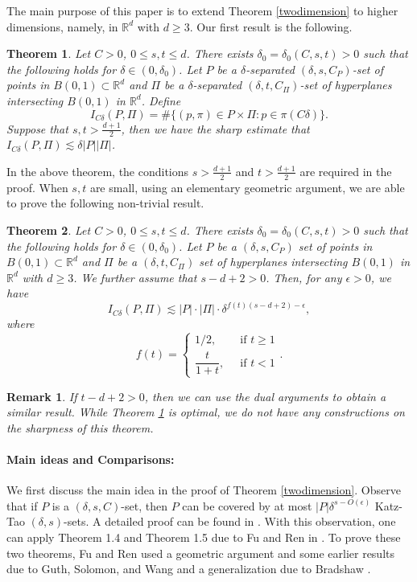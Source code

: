 \documentclass[11pt]{article}
\newtheorem{theorem}{Theorem}[section]
\newtheorem{remark}{Remark}[section]
\newcommand{\1}{\mathbf{1}}
\begin{document}
The main purpose of this paper is to extend Theorem \ref{twodimension} to higher dimensions, namely, in $\mathbb{R}^d$ with $d\ge 3$. Our first result is the following. 
\begin{theorem}\label{main-theorem}Let $C>0$, $0\le s, t\le d$. There exists $\delta_0=\delta_0(C, s, t)>0$ such that the following holds for $\delta\in (0, \delta_0)$. 
    Let $P$ be a $\delta$-separated $(\delta, s, C_P)$-set of points in $B(0, 1)\subset \mathbb{R}^d$ and $\Pi$ be a $\delta$-separated $(\delta, t, C_\Pi)$-set of hyperplanes intersecting $B(0, 1)$ in $\mathbb{R}^d$. Define 
    \[I_{C\delta}(P, \Pi)=\#\{(p, \pi)\in P\times \Pi\colon p\in \pi(C\delta)\}.\] Suppose that $s, t > \frac{d+1}{2}$,
    then we have the sharp estimate that $I_{C\delta}(P, \Pi)\lesssim \delta |P||\Pi|$. 
\end{theorem}
In the above theorem, the conditions $s > \frac{d+1}{2}$ and $t > \frac{d+1}{2}$ are required in the proof. When $s, t$ are small, using an elementary geometric argument, we are able to prove the following non-trivial result. 
\begin{theorem}\label{CSbound}Let $C>0$, $0\le s, t\le d$. There exists $\delta_0=\delta_0(C, s, t)>0$ such that the following holds for $\delta\in (0, \delta_0)$. 
    Let $P$ be a $(\delta,s,C_P)$ set of points in $B(0, 1)\subset \mathbb{R}^d$ and $\Pi$ be a $(\delta,t,C_\Pi)$ set of hyperplanes intersecting $B(0, 1)$ in $\mathbb{R}^d$ with $d \geq 3$. We further assume that $s-d+2 >0$. Then, for any $\epsilon >0$, we have
    \[I_{C\delta}(P,\Pi)\lesssim  |P|\cdot|\Pi|\cdot \delta^{f(t)(s-d+2) - \epsilon},\] where  \[
        f(t) =
        \begin{cases}
        1/2,  ~&\text{ if } t\ge 1\\
        \dfrac{t}{1+t}, ~&\text{ if } t<1
        \end{cases}.\]
\end{theorem}
\begin{remark}
    If $t-d+2 > 0$, then we can use the dual arguments to obtain a similar result. While Theorem \ref{main-theorem} is optimal, we do not have any constructions on the sharpness of this theorem. 
\end{remark}

\paragraph{Main ideas and Comparisons:} We first discuss the main idea in the proof of Theorem \ref{twodimension}. Observe that if $P$ is a $(\delta, s, C)$-set, then $P$ can be covered by at most $|P|\delta^{s-O(\epsilon)}$ Katz-Tao $(\delta, s)$-sets. A detailed proof can be found in \cite[Lemma 3.5]{motmot}. With this observation, one can apply Theorem 1.4 and Theorem 1.5 due to Fu and Ren in \cite{FuRen}. To prove these two theorems, Fu and Ren used a geometric argument and some earlier results due to Guth, Solomon, and Wang \cite{GSW} and a generalization due to Bradshaw \cite{PB}. 
\end{document}
